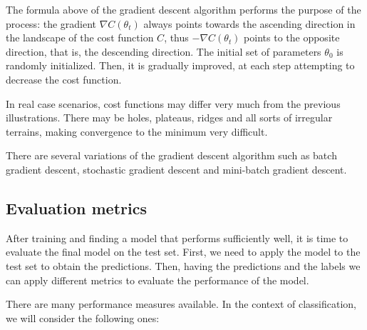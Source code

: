 The formula above of the gradient descent algorithm performs the purpose of the process: the gradient $\nabla C(\theta_t)$ always points towards the ascending direction in the landscape of the cost function $C$, thus $- \nabla C(\theta_t)$ points to the opposite direction, that is, the descending direction. The initial set of parameters $\theta_0$ is randomly initialized. Then, it is gradually improved, at each step attempting to decrease the cost function. 

In real case scenarios, cost functions may differ very much from the previous illustrations. There may be holes, plateaus, ridges and all sorts of irregular terrains, making convergence to the minimum very difficult.

There are several variations of the gradient descent algorithm such as batch gradient descent, stochastic gradient descent and mini-batch gradient descent. \cite{geron2022hands}

\subsection{Evaluation metrics}
After training and finding a model that performs sufficiently well, it is time to evaluate the final model on the test set. First, we need to apply the model to the test set to obtain the predictions. Then, having the predictions and the labels we can apply different metrics to evaluate the performance of the model.

There are many performance measures available. In the context of classification, we will consider the following ones:

